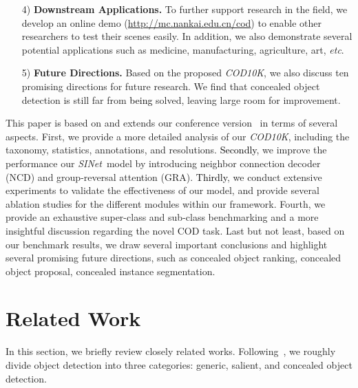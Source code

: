 \documentclass[10pt,journal,compsoc]{IEEEtran}
\def\etc{\emph{etc}}
\newcommand{\Rev}[1]{\textcolor{black}{#1}}
\def\ourdataset{\textit{COD10K}}
\def\ournewmodel{\emph{SINet}}
\begin{document}
\begin{itemize}
\item [4)] \textbf{Downstream Applications.} 
To further support research in the field, 
we develop an online demo (\url{http://mc.nankai.edu.cn/cod}) to enable other researchers to test 
their scenes easily. 
In addition, we also demonstrate several potential applications 
such as medicine, manufacturing, agriculture, art, \etc.

\item [5)] \textbf{Future Directions.} 
Based on the proposed \ourdataset, 
we also discuss ten promising directions for future research. 
We find that concealed object detection is still far from \Rev{being} solved, 
leaving large room for improvement. 

\end{itemize}



This paper is based on and extends our conference version~\cite{fan2020camouflaged} in terms of several aspects. 
First, we provide a more detailed analysis of our \ourdataset, 
including the taxonomy, statistics, annotations, and resolutions. 
\Rev{Secondly}, we improve the performance our \ournewmodel~model by introducing 
neighbor connection decoder (NCD) and group-reversal attention (GRA). 
\Rev{Thirdly}, we conduct extensive experiments to validate the effectiveness of 
our model, and provide several ablation studies for the different modules 
within our framework.
Fourth, we provide an exhaustive super-class and sub-class benchmarking 
and a more insightful discussion regarding the novel COD task.
Last but not least, based on our benchmark results, 
we draw several important conclusions and 
highlight several promising future directions,  
such as concealed object ranking, concealed object proposal, 
concealed instance segmentation. 


\section{Related Work}\label{sec:RelatedWOrks}

In this section, we briefly review closely related works. 
Following~\cite{zhao2019object}, we roughly divide object detection into 
three categories: generic, salient, and concealed object detection. 
\end{document}
